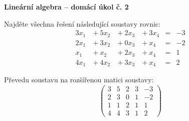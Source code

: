 \documentclass[11pt,a4paper]{article}
\newcommand{\aug}[1]{\left(\begin{array}{rrrr|r} #1 \end{array}\right)}
\begin{document}
\begin{center}
    \LARGE\textbf{Lineární algebra -- domácí úkol č. 2}
\end{center}
\vspace{1em}

Najděte všechna řešení následující soustavy rovnic:
\[
  \begin{array}{rrrrcr}
    3x_1 & {}+ 5x_2 & {}+ 2x_3 & {}+ 3x_4 & = & -3 \\
    2x_1 & {}+ 3x_2 & {}+ 0x_3 & {}+ x_4  & = & -2 \\
     x_1 & {}+ x_2  & {}+ 2x_3 & {}+ x_4  & = & 1 \\
    4x_1 & {}+ 4x_2 & {}+ 3x_3 & {}+ x_4  & = & 2
  \end{array}
\]

Převedu soustavu na rozšířenou matici soustavy:
\[
  \aug{
    3 & 5 & 2 & 3 & -3 \\
    2 & 3 & 0 & 1 & -2 \\
    1 & 1 & 2 & 1 & 1 \\
    4 & 4 & 3 & 1 & 2
  }
\]
\end{document}
